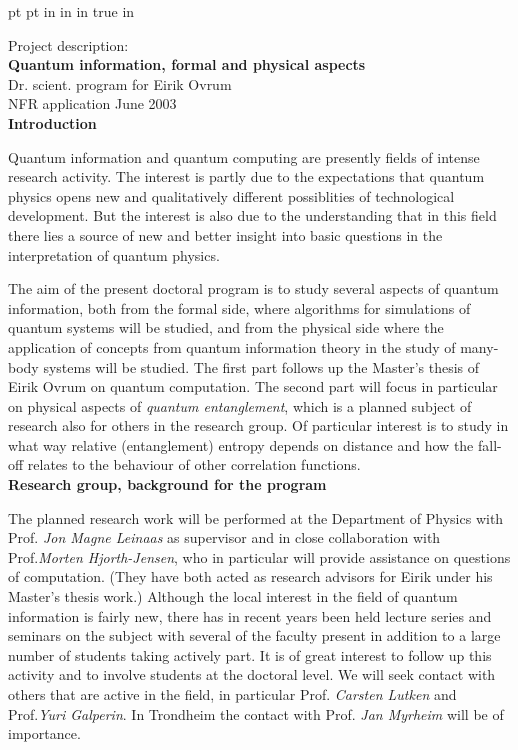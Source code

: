 
\baselineskip
{} pt
 pt
 in
 in
 in
 true in
\raggedbottom

\newcommand{\pref}[1]{(\ref{#1})}



\noindent
Project description:\\

\noindent
{\Large{\bf Quantum information, formal and physical aspects}}\\
{Dr. scient. program for Eirik Ovrum}\\
{NFR application June 2003}\\


\noindent
{\large{\bf Introduction}}

\noindent
Quantum information and quantum computing are presently fields of intense
research activity. The interest is partly due to the expectations 
that quantum physics opens new and qualitatively different
possiblities of technological development. But the interest
is also due to the understanding that in this field there lies a source of new
and better insight into basic questions in the interpretation of quantum
physics.

The aim of the present doctoral program is to study several aspects of quantum
information, both from the   formal side, 
where algorithms for simulations of quantum
systems will be studied, and from the physical side where the application of
concepts from quantum information theory in the study of many-body systems
will be studied. The first part follows up the Master's thesis of Eirik
Ovrum on quantum computation. The second part will focus in particular on
physical aspects of {\em quantum entanglement}, which is a planned subject of
research also for others in the research group. Of particular interest is
to study  in what way relative (entanglement) entropy depends on distance and
how the fall-off relates to the behaviour of other correlation functions.
\\

\noindent
{\large{\bf Research group, background for the program}}

\noindent
The planned research work will be performed at the Department
of Physics with Prof. {\em Jon Magne Leinaas} as supervisor and in close
collaboration with Prof.{\em Morten Hjorth-Jensen}, who in particular will
provide assistance on questions of computation. (They have both acted
as research
advisors for Eirik under his Master's thesis work.) Although the local
interest in the field of quantum information is fairly new, there has in recent
years been held lecture series and seminars on the subject with several  of the
faculty present in addition to a large number of students taking actively
part. It is of
great interest to follow up this activity and to involve students at
the doctoral
level. We will seek contact with others that are active in the
field, in particular Prof. {\em Carsten Lutken} and Prof.{\em Yuri
Galperin}. In
Trondheim the contact with Prof. {\em Jan Myrheim} will be of importance.\\

